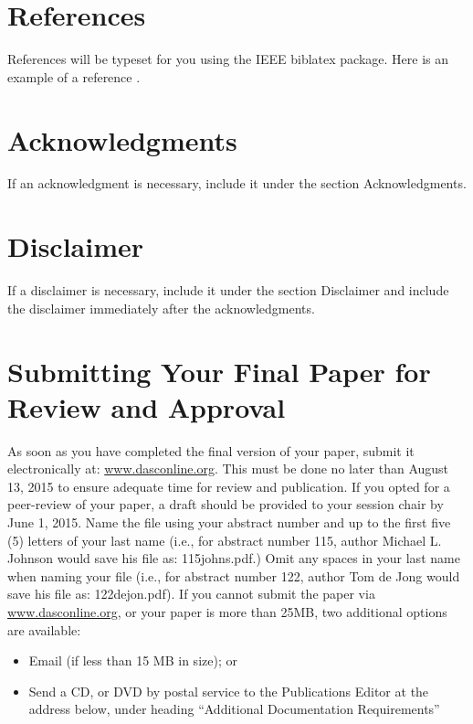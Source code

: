 \documentclass{dasc}
\begin{document}
\section*{References}

References will be typeset for you using the IEEE biblatex package. Here is an example of a reference \cite{Einstein1935}.

\section*{Acknowledgments}

If an acknowledgment is necessary, include it under the section Acknowledgments.

\section*{Disclaimer}

If a disclaimer is necessary, include it under the section Disclaimer and include the disclaimer immediately after the acknowledgments.

\section*{Submitting Your Final Paper for Review and Approval}

As soon as you have completed the final version of your paper, submit it electronically at: \url{www.dasconline.org}. This must be done no later than August 13, 2015 to ensure adequate time for review and publication.
If you opted for a peer-review of your paper, a draft should be provided to your session chair by June 1, 2015.
Name the file using your abstract number and up to the first five (5) letters of your last name (i.e., for abstract number 115, author Michael L. Johnson would save his file as: 115johns.pdf.) Omit any spaces in your last name when naming your file (i.e., for abstract number 122, author Tom de Jong would save his file as: 122dejon.pdf).
If you cannot submit the paper via \url{www.dasconline.org}, or your paper is more than 25MB, two additional options are available:
\begin{itemize}
	\item Email (if less than 15 MB in size); or
	\item Send a CD, or DVD by postal service to the Publications Editor at the address below, under heading “Additional Documentation Requirements” 
\end{itemize}
\end{document}
